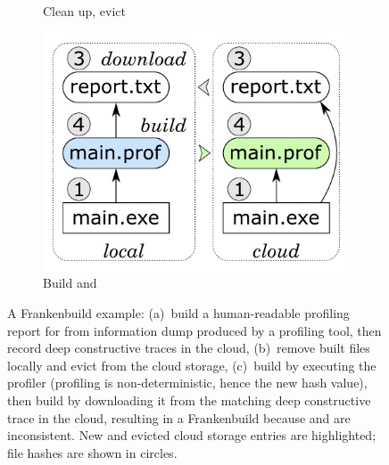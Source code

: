 \begin{figure}
\begin{subfigure}[b]{0.31\linewidth}
\caption{Clean up, evict }
\end{subfigure}
\begin{subfigure}[b]{0.36\linewidth}
\centerline{\includegraphics[scale=0.26]{fig/frankenbuild-example-rebuild.pdf}}
\caption{Build  and }
\end{subfigure}
\caption{A Frankenbuild example: (a)~build a human-readable profiling report for
 from information dump  produced by a profiling
tool, then record deep constructive traces in the cloud, (b)~remove built files
locally and evict  from the cloud storage, (c)~build
 by executing the profiler (profiling is non-deterministic, hence
the new hash value), then build  by downloading it from the
matching deep constructive trace in the cloud, resulting in a Frankenbuild
because  and  are inconsistent. New and evicted
cloud storage entries are highlighted; file hashes are shown in circles.
\label{fig-frankenbuild}}
\end{figure}

